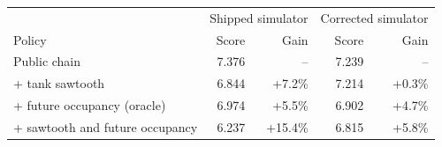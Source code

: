 \begin{tabular}{lrrrr}
\toprule
 & \multicolumn{2}{c}{Shipped simulator} & \multicolumn{2}{c}{Corrected simulator} \\
Policy & Score & Gain & Score & Gain \\
\midrule
Public chain & 7.376 & -- & 7.239 & -- \\
+ tank sawtooth & 6.844 & +7.2\% & 7.214 & +0.3\% \\
+ future occupancy (oracle) & 6.974 & +5.5\% & 6.902 & +4.7\% \\
+ sawtooth and future occupancy & 6.237 & +15.4\% & 6.815 & +5.8\% \\
\bottomrule
\end{tabular}